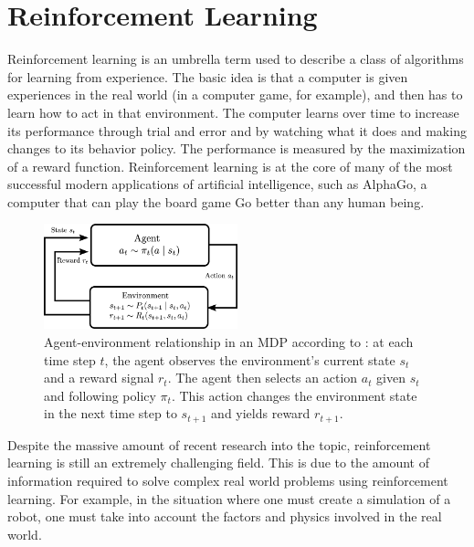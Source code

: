 \section{Reinforcement Learning}\label{chap2:reinforcement-learning}

Reinforcement learning is an umbrella term used to describe a class of algorithms for learning from experience. The basic idea is that a computer is given experiences in the real world (in a computer game, for example), and then has to learn how to act in that environment. The computer learns over time to increase its performance through trial and error and by watching what it does and making changes to its behavior policy. The performance is measured by the maximization of a reward function. Reinforcement learning is at the core of many of the most successful modern applications of artificial intelligence, such as AlphaGo, a computer that can play the board game Go better than any human being.

\begin{figure}[!ht]
    \centering
    \includegraphics[width=0.50\textwidth]{images/agent-environment.png}
    \caption{Agent-environment relationship in an MDP according to \textcite{sutton1998introduction}: at each time step $t$, the agent observes the environment's current state $s_t$ and a reward signal $r_t$. The agent then selects an action $a_t$ given $s_t$ and following policy $\pi_t$. This action changes the environment state in the next time step to $s_{t+1}$ and yields reward $r_{t+1}$.
    }
    \label{fig:agent-environment}
\end{figure}


Despite the massive amount of recent research into the topic, reinforcement learning is still an extremely challenging field. This is due to the amount of information required to solve complex real world problems using reinforcement learning. For example, in the situation where one must create a simulation of a robot, one must take into account the factors and physics involved in the real world. 


